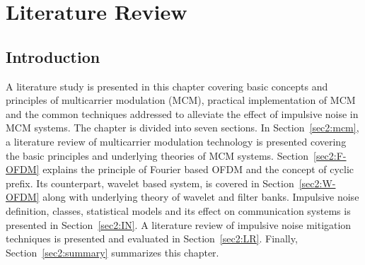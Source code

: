 \chapter{Literature Review}\label{chap2} 
	\section{Introduction}\label{sec:int}
		A literature study is presented in this chapter covering basic concepts and principles of multicarrier modulation (MCM), practical implementation of MCM and the common techniques addressed to alleviate the effect of impulsive noise in MCM systems. The chapter is divided into seven sections. In Section~\ref{sec2:mcm}, a literature review of multicarrier modulation technology is presented covering the basic principles and underlying theories of MCM systems. Section~\ref{sec2:F-OFDM} explains the principle of Fourier based OFDM and the concept of cyclic prefix. Its counterpart, wavelet based system, is covered in Section~\ref{sec2:W-OFDM} along with underlying theory of wavelet and filter banks. Impulsive noise definition, classes, statistical models and its effect on communication systems is presented in Section~\ref{sec2:IN}. A literature review of impulsive noise mitigation techniques is presented and evaluated in Section~\ref{sec2:LR}. Finally, Section~\ref{sec2:summary} summarizes this chapter.

